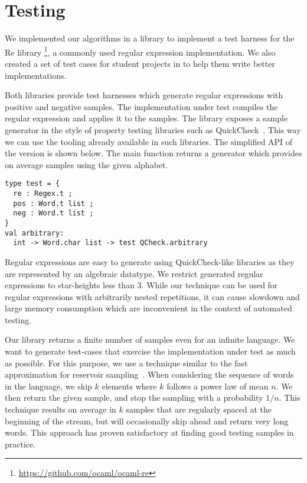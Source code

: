 \section{Testing}
\label{sec:test}

We implemented our algorithms in a library to implement a test harness for the \ocaml Re library%
\footnote{\url{https://github.com/ocaml/ocaml-re}},
a commonly used \ocaml regular expression implementation.
%
We also created a set of test cases for student projects in \haskell
to help them write better implementations.

Both libraries provide test harnesses which generate
regular expressions with positive and negative samples. The
implementation under test compiles the regular expression and applies it to the samples. 
The library exposes a sample generator in the style of
property testing libraries such as QuickCheck~\cite{DBLP:conf/icfp/ClaessenH00}.
This way we can use the tooling already available in such libraries.
%
The simplified API of the \ocaml version is shown below.
The main function  returns a generator
which provides on average  samples using the given alphabet.

\begin{lstlisting}
type test = {
  re : Regex.t ;
  pos : Word.t list ;
  neg : Word.t list ;
}
val arbitrary:
  int -> Word.char list -> test QCheck.arbitrary
\end{lstlisting}

Regular expressions are easy to generate using QuickCheck-like
libraries as they are represented by an algebraic datatype.  We
restrict generated regular expressions to star-heights less than
3. While our technique can be used for regular expressions with
arbitrarily nested repetitions, it can cause slowdown and large memory
consumption which are inconvenient in the context of automated
testing.

Our library returns a finite number of samples even for an infinite language. We want to generate 
test-cases that exercise the implementation under test as much as
possible. For this purpose, we use a technique similar to the fast
approximation for reservoir
sampling~\citep{DBLP:journals/toms/Vitter87}.  When considering the
sequence of words in the language, we skip $k$ elements where $k$
follows a power law of mean $n$. We then return the given sample, and
stop the sampling with a probability $1/n$.
%
This technique results on average in $k$ samples that are regularly
spaced at the beginning of the stream, but will occasionally skip ahead
and return very long words. This approach has proven satisfactory at finding good
testing samples in practice.

